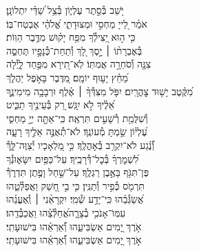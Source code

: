 \documentclass[twoside, openany, parskip=half, 11pt]{book}
\begin{document}
\begin{narrow}
יֹ֭שֵׁב בְּ֯סֵ֣תֶר עֶלְי֑וֹן
\hfill בְּ֯צֵ֥ל שַׁ֝דַּ֗י יִתְלוֹנָֽן׃ \\
אֹמַ֗ר לַ֭ייָ מַחְסִ֣י וּמְצוּדָתִ֑י \hfill אֱ֝לֹהַ֗י אֶבְטַח־בּֽוֹ׃ \\
כִּ֤י ה֣וּא יַ֭צִּילְ֯ךָ מִפַּ֥ח יָק֗וּשׁ \hfill מִדֶּ֥בֶר הַוּֽוֹת׃ \\
בְּ֯אֶבְרָת֨וֹ ׀ יָ֣סֶךְ לָ֭ךְ \hfill וְ֯תַחַת־כְּ֯נָפָ֣יו תֶּחְסֶ֑ה\\ צִנָּ֖ה וְ֯סֹחֵרָ֣ה אֲמִתּֽוֹ׃ \hfill
לֹֽא־תִ֭ירָא מִפַּ֣חַד לָ֑יְ֯לָה\\ מֵ֝חֵ֗ץ יָע֥וּף יוֹמָֽם׃ \hfill
מִ֭דֶּבֶר בָּאֹ֣פֶל יַהֲלֹ֑ךְ \\ מִ֝קֶּ֗טֶב יָשׁ֥וּד צׇהֳרָֽיִם׃ \hfill
יִפֹּ֤ל מִצִּדְּ֯ךָ֨ ׀ אֶ֗לֶף וּרְבָבָ֥ה מִימִינֶ֑ךָ\\ אֵ֝לֶ֗יךָ לֹ֣א יִגָּֽשׁ׃ \hfill
רַ֭ק בְּ֯עֵינֶ֣יךָ תַבִּ֑יט\\ וְ֯שִׁלֻּמַ֖ת רְ֯שָׁעִ֣ים תִּרְאֶֽה׃ \hfill
כִּֽי־אַתָּ֣ה יְיָ֣ מַחְסִ֑י\\ עֶ֝לְי֗וֹן שַׂ֣מְתָּ מְ֯עוֹנֶֽךָ׃ \hfill
לֹא־תְ֯אֻנֶּ֣ה אֵלֶ֣יךָ רָעָ֑ה\\ וְ֯֝נֶ֗גַע לֹא־יִקְרַ֥ב בְּ֯אׇהֳלֶֽךָ׃ \hfill
כִּ֣י מַ֭לְאָכָיו יְ֯צַוֶּה־לָּ֑ךְ֯\\ לִ֝שְׁמׇרְךָ֗ בְּ֯כׇל־דְּ֯רָכֶֽיךָ׃ \hfill
עַל־כַּפַּ֥יִם יִשָּׂא֑וּנְ֯ךָ\\ פֶּן־תִּגֹּ֖ף בָּאֶ֣בֶן רַגְלֶֽךָ׃ \hfill
עַל־שַׁ֣חַל וָפֶ֣תֶן תִּדְרֹ֑ךְ֯\\ תִּרְמֹ֖ס כְּ֯פִ֣יר וְ֯תַנִּֽין׃ \hfill
כִּ֤י בִ֣י חָ֭שַׁק וַאֲפַלְּ֯טֵ֑הוּ\\ אֲ֝שַׂגְּ֯בֵ֗הוּ כִּֽי־יָדַ֥ע שְׁ֯מִֽי׃ \hfill
יִקְרָאֵ֨נִי ׀ וְֽ֯אֶעֱנֵ֗הוּ\\ עִמּֽוֹ־אָנֹכִ֥י בְ֯צָרָ֑ה\hfill אֲ֝חַלְּ֯צֵ֗הוּ וַאֲכַבְּ֯דֵֽהוּ׃ \\
אֹ֣רֶךְ יָ֭מִים אַשְׂבִּיעֵ֑הוּ \hfill וְ֯֝אַרְאֵ֗הוּ בִּישׁוּעָתִֽי׃ \\
\scriptsize{אֹ֣רֶךְ יָ֭מִים אַשְׂבִּיעֵ֑הוּ \hfill וְ֯֝אַרְאֵ֗הוּ בִּישׁוּעָתִֽי׃ \\}
\normalsize{}


\end{narrow}
\end{document}

